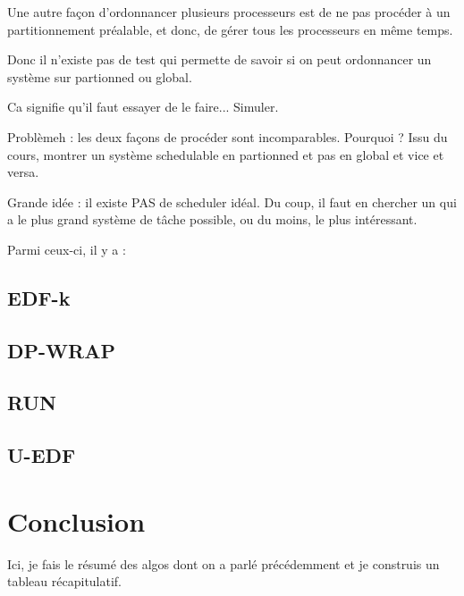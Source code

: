 \documentclass[11pt,a4paper,oneside]{report}
\begin{document}
Une autre façon d'ordonnancer plusieurs processeurs est de ne pas procéder à un partitionnement préalable, et donc, de gérer tous les processeurs en même temps. 

Donc il n'existe pas de test qui permette de savoir si on peut ordonnancer 
un système sur partionned ou global.

Ca signifie qu'il faut essayer de le faire... Simuler.

Problèmeh : les deux façons de procéder sont incomparables. Pourquoi ? Issu du cours, montrer 
un système schedulable en partionned et pas en global et vice et versa.

Grande idée : il existe PAS de scheduler idéal.
Du coup, il faut en chercher un qui a le plus grand système de tâche possible, ou du moins, 
le plus intéressant. 

Parmi ceux-ci, il y a : 

\subsection{EDF-k}
\subsection{DP-WRAP}
\subsection{RUN}
\subsection{U-EDF}


\section{Conclusion}

Ici, je fais le résumé des algos dont on a parlé précédemment et je construis un tableau récapitulatif. 



\end{document}
